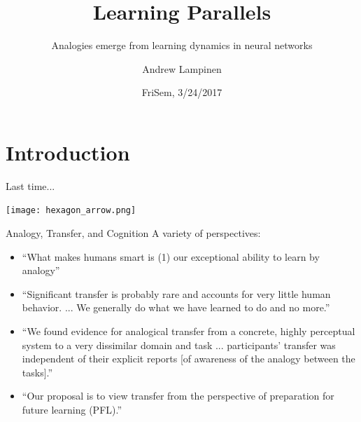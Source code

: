 \documentclass{beamer}
\begin{document}
\title{Learning Parallels}
\subtitle{Analogies emerge from learning dynamics in neural networks}
\author{Andrew Lampinen}
\date{FriSem, 3/24/2017}
\frame{\titlepage}


\section{Introduction}
\begin{frame}{Last time...}
\begin{center}
\texttt{[image: hexagon\_arrow.png]}
\end{center}
\end{frame}

\begin{frame}{Analogy, Transfer, and Cognition}
A variety of perspectives:
\begin{itemize}
    \item<1-> ``What makes humans smart is (1) our exceptional ability to learn by analogy'' \cite{Gentner2003} 
    \item<2-> ``Significant transfer is probably rare and accounts for very little human behavior. ... We generally do what we have learned to do and no more.'' \cite{Detterman1993}
    \item<3-> ``We found evidence for analogical transfer from a concrete, highly perceptual system to a very dissimilar domain and task ... participants' transfer was independent of their explicit reports [of awareness of the analogy between the tasks].'' \cite{Day2011}
    \item<4-> ``Our proposal is to view transfer from the perspective of preparation for future learning (PFL).'' \cite{Bransford1999} 
\end{itemize}
\end{frame}
\end{document}
